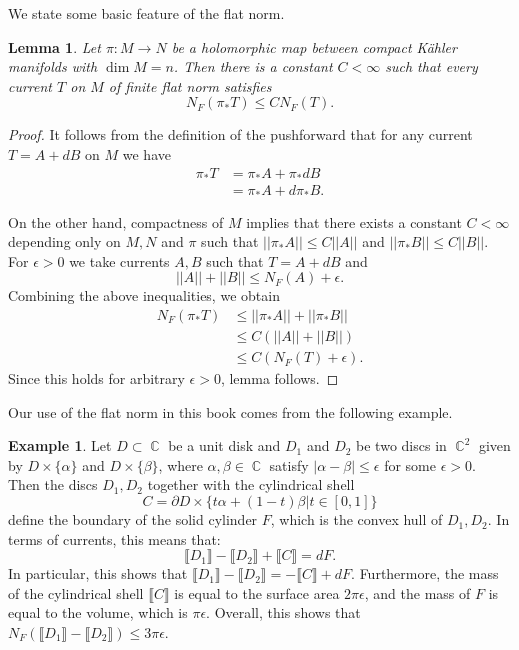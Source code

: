 \documentclass[12pt]{amsbook}%
\newtheorem{lem}[thm]{Lemma}
\theoremstyle{definition}
\newtheorem{example}[thm]{Example}
\theoremstyle{remark}
\numberwithin{section}{chapter}
\numberwithin{subsection}{section}
\numberwithin{figure}{chapter}
\DeclareMathOperator{\C}{\mathbb{C}}
\def\eps{\epsilon}
\def\kap{}
\begin{document}
{{We state some basic feature of the flat norm. 
\begin{lem} \label{prop_pushforward_flat}
Let $\pi \colon M \to N$ be a holomorphic map between compact K\"ahler manifolds with $\dim M = n$. { Then there is a constant $C<\infty$ such that every 
current $T$ on $M$ of finite flat norm satisfies}
\begin{equation*}
N_F(\pi_*T) \leqslant {\kap C}N_F(T). 
\end{equation*}  	
\end{lem}
\begin{proof} It follows from the definition of the pushforward that for any current $T= A + d B$ on $M$ we have 
\begin{align*}
	\pi_* T& = \pi_* A + \pi_* d  B \\ 
	& = \pi_* A + d \pi_*B.
\end{align*}

On the other hand, compactness of $M$ implies that there exists a constant $C<\infty$ depending only on $M, N$ and $\pi$ such that  $|| \pi_*A|| \leqslant C ||A||$ and 
$|| \pi_* B || \leqslant C ||B||$. For  $\eps>0$ we take currents $A, B$ such that $T= A + d B$ and 
$$
|| A || + ||B|| \leqslant N_F(A)+\eps. 
$$
Combining the above inequalities, we obtain 
\begin{align*}
	N_F(\pi_* T) &\leqslant || \pi_* A || + || \pi_* B|| \\ 
	& \leqslant C (|| A || + ||B||)\\ 
	& \leqslant C (N_F(T) + \epsilon).
\end{align*} 
Since this holds for arbitrary $\eps>0$, lemma follows. \end{proof}


Our use of the flat norm in this book comes from the following example.

\begin{example}\label{example:cylinder}
Let $D\subset \C$ be a unit disk and  $D_1$ and $D_2$ be two discs in $\C^2$ given by $D \times \{ \alpha\}$ and $D\times \{\beta \}$, 
where $\alpha, \beta \in \C$ satisfy $|\alpha - \beta| \leqslant \epsilon$ for some $\epsilon>0$.  
Then the discs $D_1, D_2$ together with the cylindrical shell 
$$C =\partial D \times \{ t \alpha + (1-t)\beta | t\in [0,1] \} $$ 
define the boundary of the solid cylinder $F$, which is the convex hull of $D_1, D_2$. 
In terms of currents, this means that: 
\begin{equation}
\llbracket D_1\rrbracket - \llbracket D_2\rrbracket + \llbracket C\rrbracket = d F. 
\end{equation}
In particular, this shows that $\llbracket D_1\rrbracket - \llbracket D_2\rrbracket = -\llbracket C\rrbracket + d F$. 
Furthermore, the mass of  the cylindrical shell $\llbracket C\rrbracket$ is equal to the surface area 
$2 \pi   \epsilon$, and the mass of $F$ is equal to the volume, which is $\pi \epsilon$. 
Overall, this shows that $N_F(\llbracket D_1\rrbracket - \llbracket D_2\rrbracket) \leqslant 3\pi  \epsilon$.  
  \end{example}
  
}}
\end{document}
